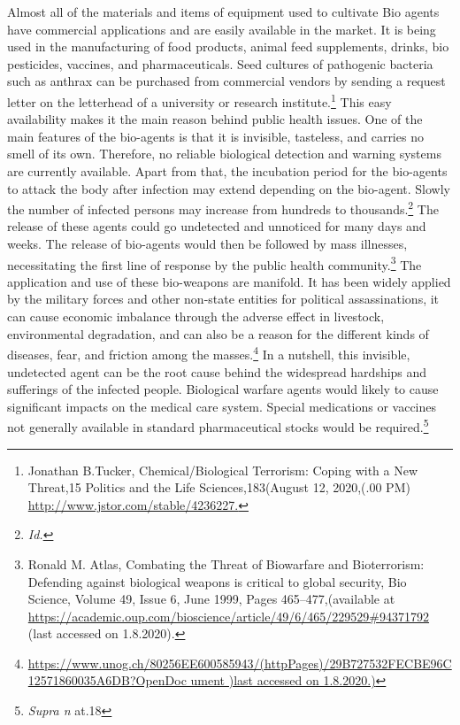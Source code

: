 \begin{multicols}{2}
\noi
Almost all of the materials and items of equipment used to cultivate Bio agents have
commercial applications and are easily available in the market. It is being used in the
manufacturing of food products, animal feed supplements, drinks, bio pesticides, vaccines,
and pharmaceuticals. Seed cultures of pathogenic bacteria such as anthrax can be purchased
from commercial vendors by sending a request letter on the letterhead of a university or
research institute.\footnote{Jonathan B.Tucker, Chemical/Biological Terrorism: Coping with a New Threat,15 Politics and the Life Sciences,183(August 12, 2020,(.00 PM) \url{http://www.jstor.com/stable/4236227.}} This easy availability makes it the main reason behind public health
issues. One of the main features of the bio-agents is that it is invisible, tasteless, and carries
no smell of its own. Therefore, no reliable biological detection and warning systems are
currently available. Apart from that, the incubation period for the bio-agents to attack the
body after infection may extend depending on the bio-agent. Slowly the number of infected
persons may increase from hundreds to thousands.\footnote{\textit{Id.}} The release of these agents could go
undetected and unnoticed for many days and weeks. The release of bio-agents would then be
followed by mass illnesses, necessitating the first line of response by the public health
community.\footnote{Ronald M. Atlas, Combating the Threat of Biowarfare and Bioterrorism: Defending against biological weapons is critical to global security, Bio Science, Volume 49, Issue 6, June 1999, Pages 465–477,(available at \url{https://academic.oup.com/bioscience/article/49/6/465/229529#94371792} (last accessed on 1.8.2020). }  The application and use of these bio-weapons are manifold. It has been widely
applied by the military forces and other non-state entities for political assassinations, it can
cause economic imbalance through the adverse effect in livestock, environmental degradation, and can also be a reason for the different kinds of diseases, fear, and friction
among the masses.\footnote{\url{https://www.unog.ch/80256EE600585943/(httpPages)/29B727532FECBE96C12571860035A6DB?OpenDoc
ument )last accessed on 1.8.2020.)}} In a nutshell, this invisible, undetected agent can be the root cause
behind the widespread hardships and sufferings of the infected people. Biological warfare
agents would likely to cause significant impacts on the medical care system. Special
medications or vaccines not generally available in standard pharmaceutical stocks would be
required.\footnote{\textit{Supra n} at.18}


\end{multicols}
